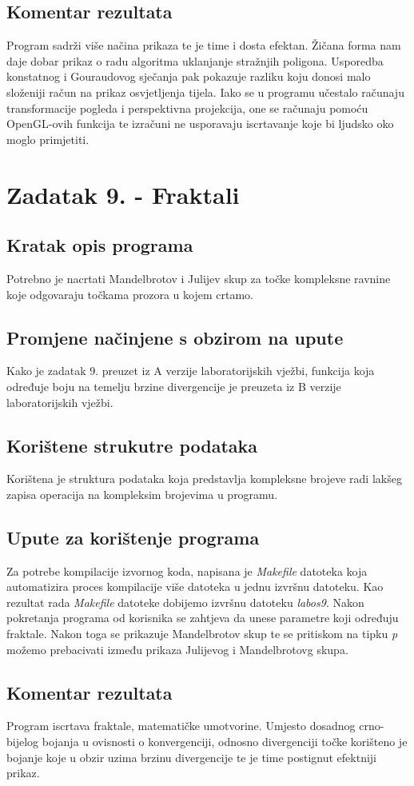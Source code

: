 \documentclass[oneside]{scrbook}
\begin{document}
\subsection{Komentar rezultata}
Program sadrži više načina prikaza te je time i dosta efektan. Žičana forma nam daje dobar prikaz o radu algoritma uklanjanje stražnjih poligona. Usporedba konstatnog i Gouraudovog sječanja pak pokazuje razliku koju donosi malo složeniji račun na prikaz osvjetljenja tijela. Iako se u programu učestalo računaju transformacije pogleda i perspektivna projekcija, one se računaju pomoću OpenGL-ovih funkcija te izračuni ne usporavaju iscrtavanje koje bi ljudsko oko moglo primjetiti.

\section{Zadatak 9. - Fraktali}
\subsection{Kratak opis programa}
Potrebno je nacrtati Mandelbrotov i Julijev skup za točke kompleksne ravnine koje odgovaraju točkama prozora u kojem crtamo. 

\subsection{Promjene načinjene s obzirom na upute}
Kako je zadatak 9. preuzet iz A verzije laboratorijskih vježbi, funkcija koja određuje boju na temelju brzine divergencije je preuzeta iz B verzije laboratorijskih vježbi.

\subsection{Korištene strukutre podataka}
Korištena je struktura podataka koja predstavlja kompleksne brojeve radi lakšeg zapisa operacija na kompleksim brojevima u programu.

\subsection{Upute za korištenje programa}
Za potrebe kompilacije izvornog koda, napisana je \textit{Makefile} datoteka koja automatizira proces kompilacije više datoteka u jednu izvršnu datoteku. Kao rezultat rada \textit{Makefile} datoteke dobijemo izvršnu datoteku \textit{labos9}. Nakon pokretanja programa od korisnika se zahtjeva da unese parametre koji određuju fraktale. Nakon toga se prikazuje Mandelbrotov skup te se pritiskom na tipku \textit{p} možemo prebacivati između prikaza Julijevog i Mandelbrotovg skupa.

\subsection{Komentar rezultata}
Program iscrtava fraktale, matematičke umotvorine. Umjesto dosadnog crno-bijelog bojanja u ovisnosti o konvergenciji, odnosno divergenciji točke korišteno je bojanje koje u obzir uzima brzinu divergencije te je time postignut efektniji prikaz.
\end{document}
